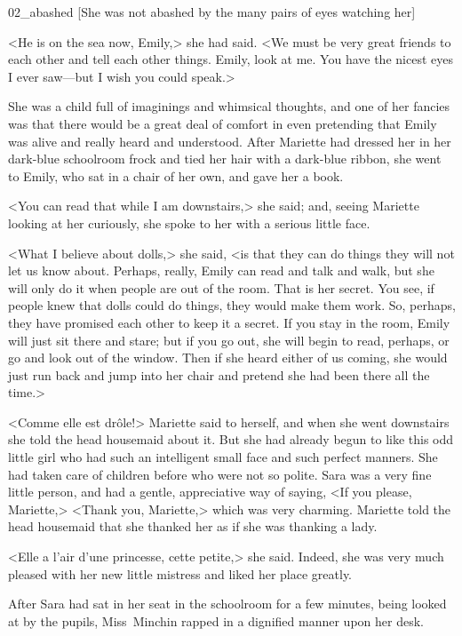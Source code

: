 \begin{colorbigpic}
	[\basicscale]
	{02_abashed}
	[She was not abashed by the many pairs of eyes watching her]
\end{colorbigpic}

<He is on the sea now, Emily,> she had said. <We must be very great friends to each other and tell each other things. Emily, look at me. You have the nicest eyes I ever saw—but I wish you could speak.>

She was a child full of imaginings and whimsical thoughts, and one of her fancies was that there would be a great deal of comfort in even pretending that Emily was alive and really heard and understood. After Mariette had dressed her in her dark-blue schoolroom frock and tied her hair with a dark-blue ribbon, she went to Emily, who sat in a chair of her own, and gave her a book.

<You can read that while I am downstairs,> she said; and, seeing Mariette looking at her curiously, she spoke to her with a serious little face.

<What I believe about dolls,> she said, <is that they can do things they will not let us know about. Perhaps, really, Emily can read and talk and walk, but she will only do it when people are out of the room. That is her secret. You see, if people knew that dolls could do things, they would make them work. So, perhaps, they have promised each other to keep it a secret. If you stay in the room, Emily will just sit there and stare; but if you go out, she will begin to read, perhaps, or go and look out of the window. Then if she heard either of us coming, she would just run back and jump into her chair and pretend she had been there all the time.>

<\textfrench{Comme elle est drôle!}> Mariette said to herself, and when she went downstairs she told the head housemaid about it. But she had already begun to like this odd little girl who had such an intelligent small face and such perfect manners. She had taken care of children before who were not so polite. Sara was a very fine little person, and had a gentle, appreciative way of saying, <If you please, Mariette,> <Thank you, Mariette,> which was very charming. Mariette told the head housemaid that she thanked her as if she was thanking a lady.

<\textfrench{Elle a l'air d'une princesse, cette petite,}> she said. Indeed, she was very much pleased with her new little mistress and liked her place greatly.

After Sara had sat in her seat in the schoolroom for a few minutes, being looked at by the pupils, Miss~Minchin rapped in a dignified manner upon her desk.

